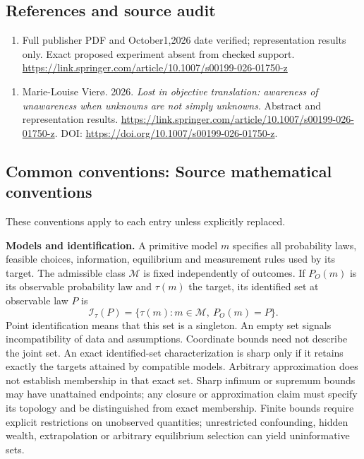 \documentclass[11pt,a4paper]{article}
\begin{document}
\subsection*{References and source audit}
\begin{enumerate}
\item Full publisher PDF and October1,2026 date verified; representation results only. Exact proposed experiment absent from checked support. \url{https://link.springer.com/article/10.1007/s00199-026-01750-z}
\end{enumerate}
\begin{enumerate}\raggedright
\item\hypertarget{definitions:source:30007557:1}{} Marie-Louise Vier\o{}. 2026. \emph{Lost in objective translation: awareness of unawareness when unknowns are not simply unknowns}. Abstract and representation results.
\url{https://link.springer.com/article/10.1007/s00199-026-01750-z}.
DOI: \url{https://doi.org/10.1007/s00199-026-01750-z}.
\end{enumerate}

\subsection*{Common conventions: Source mathematical conventions}

These conventions apply to each entry unless explicitly replaced.

\textbf{Models and identification.} A primitive model \(m\) specifies all probability laws, feasible choices, information, equilibrium and measurement rules used by its target. The admissible class \(\mathcal M\) is fixed independently of outcomes. If \(P_O(m)\) is its observable probability law and \(\tau(m)\) the target, its identified set at observable law \(P\) is
\[
 \mathcal I_\tau(P)=\{\tau(m):m\in\mathcal M,\ P_O(m)=P\}.
\]
Point identification means that this set is a singleton. An empty set signals incompatibility of data and assumptions. Coordinate bounds need not describe the joint set. An exact identified-set characterization is sharp only if it retains exactly the targets attained by compatible models. Arbitrary approximation does not establish membership in that exact set. Sharp infimum or supremum bounds may have unattained endpoints; any closure or approximation claim must specify its topology and be distinguished from exact membership. Finite bounds require explicit restrictions on unobserved quantities; unrestricted confounding, hidden wealth, extrapolation or arbitrary equilibrium selection can yield uninformative sets.
\end{document}
